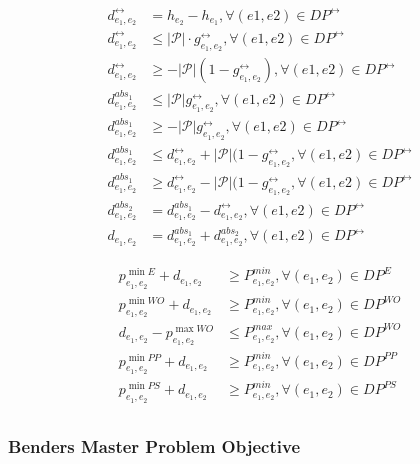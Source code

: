 \documentclass{article}
\newcommand{\scriptP}{\mathcal{P}}
\begin{document}
\begin{align}
    d^{\leftrightarrow}_{e_1, e_2} &= h_{e_2} - h_{e_1}  , \forall (e1, e2) \in DP^{\leftrightarrow} \\
    d^{\leftrightarrow}_{e_1, e_2} &\le |\scriptP|\cdot g^{\leftrightarrow}_{e_1, e_2}  , \forall (e1, e2) \in DP^{\leftrightarrow} \\
    d^{\leftrightarrow}_{e_1, e_2} &\ge - |\scriptP| (1 - g^{\leftrightarrow}_{e_1, e_2})   , \forall (e1, e2) \in DP^{\leftrightarrow} \\
    d^{abs_1}_{e_1, e_2} &\le |\scriptP|g^{\leftrightarrow}_{e_1, e_2}  , \forall (e1, e2) \in DP^{\leftrightarrow} \\
    d^{abs_1}_{e_1, e_2} &\ge - |\scriptP|g^{\leftrightarrow}_{e_1, e_2}  , \forall (e1, e2) \in DP^{\leftrightarrow} \\
    d^{abs_1}_{e_1, e_2} &\le d^{\leftrightarrow}_{e_1, e_2} + |\scriptP| (1 - g^{\leftrightarrow}_{e_1, e_2}  , \forall (e1, e2) \in DP^{\leftrightarrow} \\
    d^{abs_1}_{e_1, e_2} &\ge d^{\leftrightarrow}_{e_1, e_2} - |\scriptP| (1 - g^{\leftrightarrow}_{e_1, e_2}  , \forall (e1, e2) \in DP^{\leftrightarrow} \\
    d^{abs_2}_{e_1, e_2} &= d^{abs_1}_{e_1, e_2} - d^{\leftrightarrow}_{e_1, e_2}  , \forall (e1, e2) \in DP^{\leftrightarrow} \\
    d_{e_1, e_2} &= d^{abs_1}_{e_1, e_2} + d^{abs_2}_{e_1, e_2} , \forall (e1, e2) \in DP^{\leftrightarrow} 
\end{align}

\begin{align}
    p^{\min E}_{e_1, e_2} + d_{e_1, e_2} &\ge P^{min}_{e_1, e_2}, \forall (e_1, e_2)\in DP^{E} \\
    p^{\min WO}_{e_1, e_2} + d_{e_1, e_2} &\ge P^{min}_{e_1, e_2}, \forall (e_1, e_2)\in DP^{WO} \\
    d_{e_1, e_2} - p^{\max WO}_{e_1, e_2} &\le P^{max}_{e_1, e_2}, \forall (e_1, e_2)\in DP^{WO} \\
    p^{\min PP}_{e_1, e_2} + d_{e_1, e_2} &\ge P^{min}_{e_1, e_2}, \forall (e_1, e_2)\in DP^{PP} \\
    p^{\min PS}_{e_1, e_2} + d_{e_1, e_2} &\ge P^{min}_{e_1, e_2}, \forall (e_1, e_2)\in DP^{PS} \\
\end{align}

\subsubsection{Benders Master Problem Objective}
\end{document}

